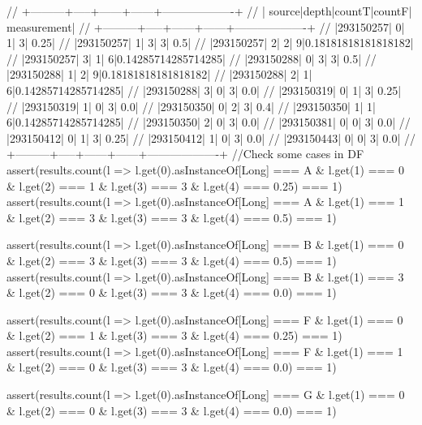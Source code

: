 \begin{listing}
{{//      +---------+-----+------+------+-------------------+
//      |   source|depth|countT|countF|        measurement|
//      +---------+-----+------+------+-------------------+
//      |293150257|    0|     1|     3|               0.25|
//      |293150257|    1|     3|     3|                0.5|
//      |293150257|    2|     2|     9|0.18181818181818182|
//      |293150257|    3|     1|     6|0.14285714285714285|
//      |293150288|    0|     3|     3|                0.5|
//      |293150288|    1|     2|     9|0.18181818181818182|
//      |293150288|    2|     1|     6|0.14285714285714285|
//      |293150288|    3|     0|     3|                0.0|
//      |293150319|    0|     1|     3|               0.25|
//      |293150319|    1|     0|     3|                0.0|
//      |293150350|    0|     2|     3|                0.4|
//      |293150350|    1|     1|     6|0.14285714285714285|
//      |293150350|    2|     0|     3|                0.0|
//      |293150381|    0|     0|     3|                0.0|
//      |293150412|    0|     1|     3|               0.25|
//      |293150412|    1|     0|     3|                0.0|
//      |293150443|    0|     0|     3|                0.0|
//      +---------+-----+------+------+-------------------+
    //Check some cases in DF
    assert(results.count(l => l.get(0).asInstanceOf[Long] === A & l.get(1) === 0
    & l.get(2) === 1 & l.get(3) === 3 & l.get(4) === 0.25) === 1)
    assert(results.count(l => l.get(0).asInstanceOf[Long] === A & l.get(1) === 1
    & l.get(2) === 3 & l.get(3) === 3 & l.get(4) === 0.5) === 1)

    assert(results.count(l => l.get(0).asInstanceOf[Long] === B & l.get(1) === 0
    & l.get(2) === 3 & l.get(3) === 3 & l.get(4) === 0.5) === 1)
    assert(results.count(l => l.get(0).asInstanceOf[Long] === B & l.get(1) === 3
    & l.get(2) === 0 & l.get(3) === 3 & l.get(4) === 0.0) === 1)

    assert(results.count(l => l.get(0).asInstanceOf[Long] === F & l.get(1) === 0
    & l.get(2) === 1 & l.get(3) === 3 & l.get(4) === 0.25) === 1)
    assert(results.count(l => l.get(0).asInstanceOf[Long] === F & l.get(1) === 1
    & l.get(2) === 0 & l.get(3) === 3 & l.get(4) === 0.0) === 1)

    assert(results.count(l => l.get(0).asInstanceOf[Long] === G & l.get(1) === 0
    & l.get(2) === 0 & l.get(3) === 3 & l.get(4) === 0.0) === 1)
  }
}

\end{listing}
